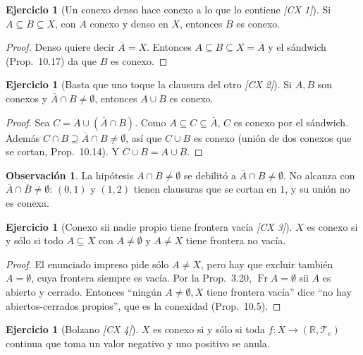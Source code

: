 \documentclass[11pt,a4paper]{article}
\theoremstyle{definition}
\newtheorem{observacion}[definicion]{Observación}
\newtheorem{ejercicio}[definicion]{Ejercicio}
\theoremstyle{plain}
\newcommand{\fnt}[1]{{\normalfont\small\itshape\color{gray!150!black}[#1]}}
\newcommand{\R}{\mathbb{R}}
\newcommand{\cl}[1]{\overline{#1}}
\newcommand{\fr}{\operatorname{Fr}}
\newcommand{\tp}{\mathcal{T}}
\begin{document}
\begin{ejercicio}[Un conexo denso hace conexo a lo que lo contiene \fnt{CX 1}]
Si $A\subseteq B\subseteq X$, con $A$ conexo y denso en $X$, entonces $B$ es conexo.
\end{ejercicio}

\begin{proof}
Denso quiere decir $\cl A=X$. Entonces $A\subseteq B\subseteq X=\cl A$ y el sándwich (Prop.\ 10.17) da que $B$ es conexo.
\end{proof}

\begin{ejercicio}[Basta que uno toque la clausura del otro \fnt{CX 2}]
Si $A,B$ son conexos y $\cl A\cap B\ne\emptyset$, entonces $A\cup B$ es conexo.
\end{ejercicio}

\begin{proof}
Sea $C=A\cup(\cl A\cap B)$. Como $A\subseteq C\subseteq\cl A$, $C$ es conexo por el sándwich. Además $C\cap B\supseteq\cl A\cap B\ne\emptyset$, así que $C\cup B$ es conexo (unión de dos conexos que se cortan, Prop.\ 10.14). Y $C\cup B=A\cup B$.
\end{proof}

\begin{observacion}
La hipótesis $A\cap B\ne\emptyset$ se debilitó a $\cl A\cap B\ne\emptyset$. No alcanza con $\cl A\cap\cl B\ne\emptyset$: $(0,1)$ y $(1,2)$ tienen clausuras que se cortan en $1$, y su unión no es conexa.
\end{observacion}

\begin{ejercicio}[Conexo sii nadie propio tiene frontera vacía \fnt{CX 3}]
$X$ es conexo si y sólo si todo $A\subseteq X$ con $A\ne\emptyset$ y $A\ne X$ tiene frontera no vacía.
\end{ejercicio}

\begin{proof}
El enunciado impreso pide sólo $A\ne X$, pero hay que excluir también $A=\emptyset$, cuya frontera siempre es vacía. Por la Prop.\ 3.20, $\fr A=\emptyset$ sii $A$ es abierto y cerrado. Entonces ``ningún $A\ne\emptyset,X$ tiene frontera vacía'' dice ``no hay abiertos-cerrados propios'', que es la conexidad (Prop.\ 10.5).
\end{proof}

\begin{ejercicio}[Bolzano \fnt{CX 4}]
$X$ es conexo si y sólo si toda $f:X\to(\R,\tp_e)$ continua que toma un valor negativo y uno positivo se anula.
\end{ejercicio}
\end{document}
